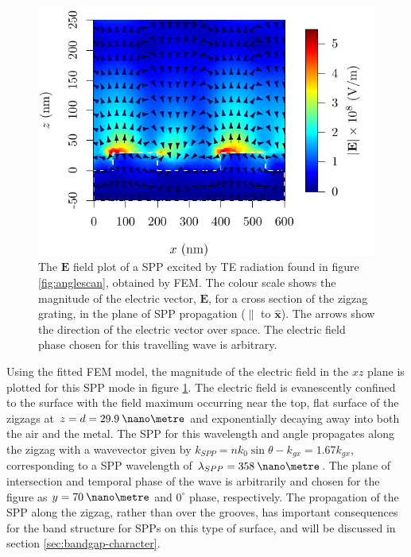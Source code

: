 \begin{figure}
\includegraphics[]{figure-fieldplot-SPPonZigzag.pdf}
\centering \caption[The $\mathbf{E}$ field plot of a SPP excited by TE radiation.]{The $\mathbf{E}$ field plot of a SPP excited by TE radiation found in figure \ref{fig:anglescan}, obtained by FEM. The colour scale shows the magnitude of the electric vector, $\mathbf{E}$, for a cross section of the zigzag grating, in the plane of SPP propagation ($\parallel$ to $\mathbf{\hat{x}}$). The arrows show the direction of the electric vector over space. The electric field phase chosen for this travelling wave is arbitrary.\label{fig:zzfield-plot-expt}}
\end{figure}

Using the fitted FEM model, the magnitude of the electric field in the $xz$ plane is plotted for this SPP mode in figure \ref{fig:zzfield-plot-expt}. The electric field is evanescently confined to the surface with the field maximum occurring near the top, flat surface of the zigzags at $z=d=29.9\: \nano\metre$ and exponentially decaying away into both the air and the metal. The SPP for this wavelength and angle propagates along the zigzag with a wavevector given by $k_{SPP}=nk_0 \sin \theta - k_{gx}=1.67k_{gx}$, corresponding to a SPP wavelength of $\lambda_{SPP}=358\:\nano\metre$. The plane of intersection and temporal phase of the wave is arbitrarily and chosen for the figure as $y=70\:\nano\metre$ and $0^\circ$ phase, respectively. The propagation of the SPP along the zigzag, rather than over the grooves, has important consequences for the band structure for SPPs on this type of surface, and will be discussed in section \ref{sec:bandgap-character}.

